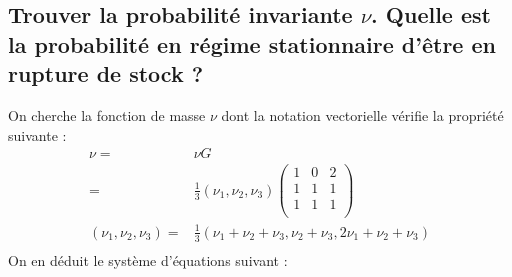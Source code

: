 \documentclass[10pt,a4paper,twoside]{article}
\begin{document}
\subsection{Trouver la probabilité invariante $\nu$. Quelle est la probabilité en régime stationnaire d'être en rupture de stock ?}
On cherche la fonction de masse $\nu$ dont la notation vectorielle vérifie la propriété suivante :
\begin{align*}
\nu =& \nu G\\
=& \frac{1}{3}\left(\nu_{1},\nu_{2},\nu_{3}\right) \left(\begin{array}{ccc}
1 & 0 & 2\\
1 & 1 & 1\\
1 & 1 & 1\\
\end{array}\right)\\
\left(\nu_{1},\nu_{2},\nu_{3}\right)=& \frac{1}{3}\left(\nu_{1}+\nu_{2}+\nu_{3}, \nu_{2}+\nu_{3}, 2\nu_{1}+\nu_{2}+\nu_{3}\right)\\
\end{align*}
On en déduit le système d'équations suivant :
\end{document}
